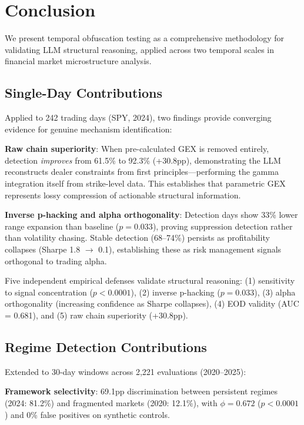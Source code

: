 \section{Conclusion}
\label{sec:conclusion}

We present temporal obfuscation testing as a comprehensive methodology for validating LLM structural reasoning, applied across two temporal scales in financial market microstructure analysis.

\subsection{Single-Day Contributions}

Applied to 242 trading days (SPY, 2024), two findings provide converging evidence for genuine mechanism identification:

\textbf{Raw chain superiority}: When pre-calculated GEX is removed entirely, detection \textit{improves} from 61.5\% to 92.3\% (+30.8pp), demonstrating the LLM reconstructs dealer constraints from first principles---performing the gamma integration itself from strike-level data. This establishes that parametric GEX represents lossy compression of actionable structural information.

\textbf{Inverse p-hacking and alpha orthogonality}: Detection days show 33\% lower range expansion than baseline ($p = 0.033$), proving suppression detection rather than volatility chasing. Stable detection (68--74\%) persists as profitability collapses (Sharpe 1.8 $\rightarrow$ 0.1), establishing these as risk management signals orthogonal to trading alpha.

Five independent empirical defenses validate structural reasoning: (1) sensitivity to signal concentration ($p < 0.0001$), (2) inverse p-hacking ($p = 0.033$), (3) alpha orthogonality (increasing confidence as Sharpe collapses), (4) EOD validity (AUC = 0.681), and (5) raw chain superiority (+30.8pp).

\subsection{Regime Detection Contributions}

Extended to 30-day windows across 2,221 evaluations (2020--2025):

\textbf{Framework selectivity}: 69.1pp discrimination between persistent regimes (2024: 81.2\%) and fragmented markets (2020: 12.1\%), with $\phi = 0.672$ ($p < 0.0001$) and 0\% false positives on synthetic controls.

